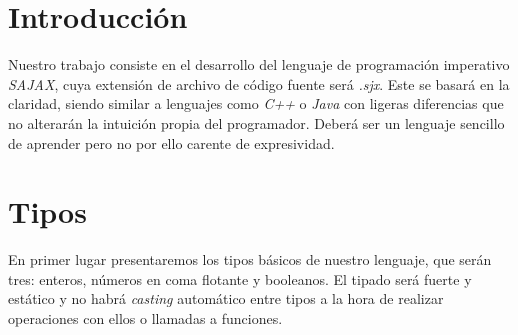 \documentclass[10pt a4paper]{article}
\numberwithin{equation}{section}
\begin{document}
\section{Introducción}
Nuestro trabajo consiste en el desarrollo del lenguaje de programación imperativo \textit{SAJAX}, cuya extensión de archivo de código fuente será \textit{.sjx}. Este se basará en la claridad, siendo similar a lenguajes como \textit{C++} o \textit{Java} con ligeras diferencias que no alterarán la intuición propia del programador. Deberá ser un lenguaje sencillo de aprender pero no por ello carente de expresividad.
\newline
\section{Tipos}
En primer lugar presentaremos los tipos básicos de nuestro lenguaje, que serán tres: enteros, números en coma flotante y booleanos. El tipado será fuerte y estático y no habrá \textit{casting} automático entre tipos a la hora de realizar operaciones con ellos o llamadas a funciones.
\end{document}
